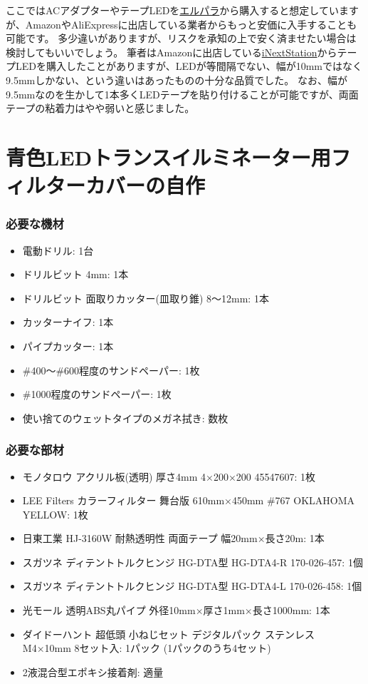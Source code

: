 \documentclass[titlepage,10pt,a4paper,uplatex]{jsbook}
\begin{document}
ここではACアダプターやテープLEDを\href{https://www.led-paradise.com/}{エルパラ}から購入すると想定していますが、AmazonやAliExpressに出店している業者からもっと安価に入手することも可能です。
多少違いがありますが、リスクを承知の上で安く済ませたい場合は検討してもいいでしょう。
筆者はAmazonに出店している\href{https://www.amazon.co.jp/stores/page/58F2653F-505D-44C4-BEFC-B62D11F2583A}{iNextStation}からテープLEDを購入したことがありますが、LEDが等間隔でない、幅が10mmではなく9.5mmしかない、という違いはあったものの十分な品質でした。
なお、幅が9.5mmなのを生かして1本多くLEDテープを貼り付けることが可能ですが、両面テープの粘着力はやや弱いと感じました。

\section{青色LEDトランスイルミネーター用フィルターカバーの自作}\label{makingfiltercover}

\subsubsection{必要な機材}
\begin{itemize}
\item 電動ドリル: 1台
\item ドリルビット 4mm: 1本
\item ドリルビット 面取りカッター(皿取り錐) 8～12mm: 1本
\item カッターナイフ: 1本
\item パイプカッター: 1本
\item \#400～\#600程度のサンドペーパー: 1枚
\item \#1000程度のサンドペーパー: 1枚
\item 使い捨てのウェットタイプのメガネ拭き: 数枚
\end{itemize}

\subsubsection{必要な部材}
\begin{itemize}
\item モノタロウ アクリル板(透明) 厚さ4mm 4×200×200 45547607: 1枚
\item LEE Filters カラーフィルター 舞台版 610mm×450mm \#767 OKLAHOMA YELLOW: 1枚
\item 日東工業 HJ-3160W 耐熱透明性 両面テープ 幅20mm×長さ20m: 1本
\item スガツネ ディテントトルクヒンジ HG-DTA型 HG-DTA4-R 170-026-457: 1個
\item スガツネ ディテントトルクヒンジ HG-DTA型 HG-DTA4-L 170-026-458: 1個
\item 光モール 透明ABS丸パイプ 外径10mm×厚さ1mm×長さ1000mm: 1本
\item ダイドーハント 超低頭 小ねじセット デジタルパック ステンレス M4×10mm 8セット入: 1パック (1パックのうち4セット)
\item 2液混合型エポキシ接着剤: 適量
\end{itemize}
\end{document}
